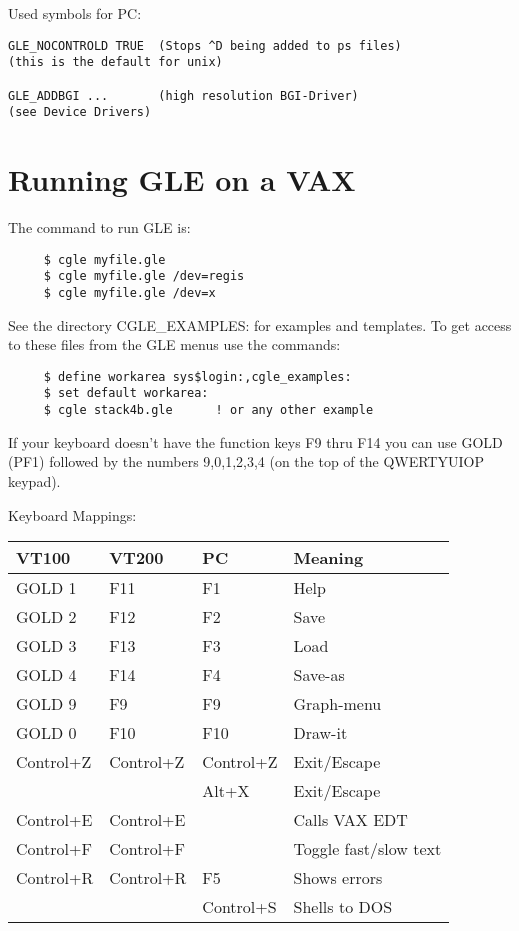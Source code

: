 Used symbols for PC:
\begin{verbatim}
GLE_NOCONTROLD TRUE  (Stops ^D being added to ps files)
(this is the default for unix)

GLE_ADDBGI ...       (high resolution BGI-Driver)
(see Device Drivers)
\end{verbatim}
%
%

%

\section{Running GLE on a VAX}
The command to run GLE is:
\begin{verbatim}
     $ cgle myfile.gle
     $ cgle myfile.gle /dev=regis
     $ cgle myfile.gle /dev=x
\end{verbatim}
See the directory CGLE\_EXAMPLES: for examples and templates.
To get access to these files from the GLE menus use the commands:
\begin{verbatim}
     $ define workarea sys$login:,cgle_examples:
     $ set default workarea:
     $ cgle stack4b.gle      ! or any other example
\end{verbatim}

If your keyboard doesn't have the function keys F9 thru F14 you can
use GOLD (PF1) followed by the numbers 9,0,1,2,3,4 (on the top of the
QWERTYUIOP keypad).

Keyboard Mappings:\\
\begin{center}
\begin{tabular}{|l|l|l|l|} \hline
VT100  & VT200 &  PC	& Meaning	\\ \hline
GOLD 1 & F11  & F1	& Help 		\\
GOLD 2 & F12  & F2	& Save		\\
GOLD 3 & F13  & F3	& Load		\\
GOLD 4 & F14  & F4	& Save-as	\\
GOLD 9 & F9   & F9   	& Graph-menu	\\
GOLD 0 & F10  & F10  	& Draw-it 	\\
Control+Z & Control+Z & Control+Z 	& Exit/Escape \\
& & Alt+X		& Exit/Escape \\
Control+E & Control+E  & 	& Calls VAX EDT	\\
Control+F & Control+F  & 	& Toggle fast/slow text \\
Control+R & Control+R  & F5	& Shows errors \\
& & Control+S	& Shells to DOS \\ \hline
\end{tabular}
\end{center}


